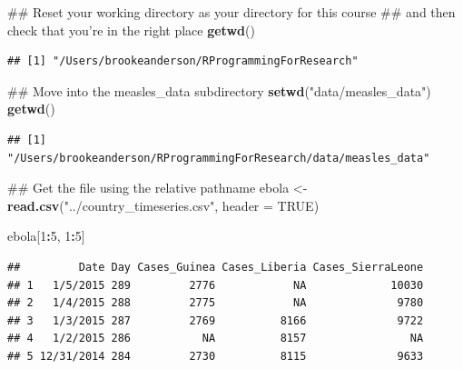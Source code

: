\documentclass[]{book}
\makeatletter
\newenvironment{Shaded}{\begin{snugshade}}{\end{snugshade}}
\newcommand{\KeywordTok}[1]{\textcolor[rgb]{0.13,0.29,0.53}{\textbf{#1}}}
\newcommand{\DataTypeTok}[1]{\textcolor[rgb]{0.13,0.29,0.53}{#1}}
\newcommand{\DecValTok}[1]{\textcolor[rgb]{0.00,0.00,0.81}{#1}}
\newcommand{\StringTok}[1]{\textcolor[rgb]{0.31,0.60,0.02}{#1}}
\newcommand{\OtherTok}[1]{\textcolor[rgb]{0.56,0.35,0.01}{#1}}
\newcommand{\OperatorTok}[1]{\textcolor[rgb]{0.81,0.36,0.00}{\textbf{#1}}}
\newcommand{\NormalTok}[1]{#1}
\newenvironment{kframe}{%
\medskip{}
\setlength{\fboxsep}{.8em}
 \def\at@end@of@kframe{}%
 \ifinner\ifhmode%
  \def\at@end@of@kframe{\end{minipage}}%
  \begin{minipage}{\columnwidth}%
 \fi\fi%
 \def\FrameCommand##1{\hskip\@totalleftmargin \hskip-\fboxsep
 \colorbox{shadecolor}{##1}\hskip-\fboxsep
     \hskip-\linewidth \hskip-\@totalleftmargin \hskip\columnwidth}%
 \MakeFramed {\advance\hsize-\width
   \@totalleftmargin\z@ \linewidth\hsize
   \@setminipage}}%
 {\par\unskip\endMakeFramed%
 \at@end@of@kframe}
\renewenvironment{Shaded}{\begin{kframe}}{\end{kframe}}
\theoremstyle{definition}
\theoremstyle{definition}
\theoremstyle{definition}
\theoremstyle{remark}
\makeatother
\begin{document}
\begin{Shaded}
\begin{Highlighting}[]
\NormalTok{## Reset your working directory as your directory for this course}
\NormalTok{## and then check that you're in the right place}
\KeywordTok{getwd}\NormalTok{()}
\end{Highlighting}
\end{Shaded}

\begin{verbatim}
## [1] "/Users/brookeanderson/RProgrammingForResearch"
\end{verbatim}

\begin{Shaded}
\begin{Highlighting}[]
\NormalTok{## Move into the measles_data subdirectory}
\KeywordTok{setwd}\NormalTok{(}\StringTok{"data/measles_data"}\NormalTok{)}
\KeywordTok{getwd}\NormalTok{()}
\end{Highlighting}
\end{Shaded}

\begin{verbatim}
## [1] "/Users/brookeanderson/RProgrammingForResearch/data/measles_data"
\end{verbatim}

\begin{Shaded}
\begin{Highlighting}[]
\NormalTok{## Get the file using the relative pathname}
\NormalTok{ebola <-}\StringTok{ }\KeywordTok{read.csv}\NormalTok{(}\StringTok{"../country_timeseries.csv"}\NormalTok{, }\DataTypeTok{header =} \OtherTok{TRUE}\NormalTok{) }
\end{Highlighting}
\end{Shaded}

\begin{Shaded}
\begin{Highlighting}[]
\NormalTok{ebola[}\DecValTok{1}\OperatorTok{:}\DecValTok{5}\NormalTok{, }\DecValTok{1}\OperatorTok{:}\DecValTok{5}\NormalTok{]}
\end{Highlighting}
\end{Shaded}

\begin{verbatim}
##         Date Day Cases_Guinea Cases_Liberia Cases_SierraLeone
## 1   1/5/2015 289         2776            NA             10030
## 2   1/4/2015 288         2775            NA              9780
## 3   1/3/2015 287         2769          8166              9722
## 4   1/2/2015 286           NA          8157                NA
## 5 12/31/2014 284         2730          8115              9633
\end{verbatim}
\end{document}
